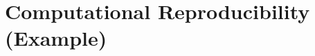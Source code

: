 \documentclass[12pt,a4paper]{article}
\begin{document}
	


\section{Computational Reproducibility (Example)}
\end{document}
